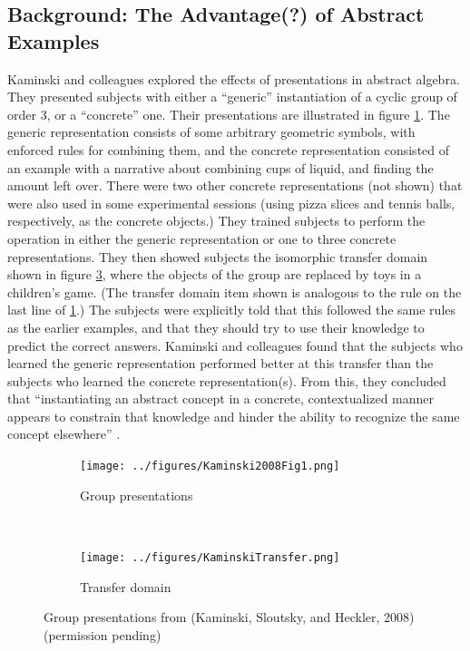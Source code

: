 \documentclass[man,10pt]{apa6}
\begin{document}
\subsection{Background: The Advantage(?) of Abstract Examples}
Kaminski and colleagues \cite{Kaminski2008} explored the effects of presentations in abstract algebra. They presented subjects with either a ``generic'' instantiation of a cyclic group of order 3, or a ``concrete'' one. Their presentations are illustrated in figure \ref{kaminskitraining}. The generic representation consists of some arbitrary geometric symbols, with enforced rules for combining them, and the concrete representation consisted of an example with a narrative about combining cups of liquid, and finding the amount left over. There were two other concrete representations (not shown) that were also used in some experimental sessions (using pizza slices and tennis balls, respectively, as the concrete objects.) They trained subjects to perform the operation in either the generic representation or one to three concrete representations. They then showed subjects the isomorphic transfer domain shown in figure \ref{kaminskitransfer}, where the objects of the group are replaced by toys in a children's game. (The transfer domain item shown is analogous to the rule on the last line of \ref{kaminskitraining}.) The subjects were explicitly told that this followed the same rules as the earlier examples, and that they should try to use their knowledge to predict the correct answers. Kaminski and colleagues found that the subjects who learned the generic representation performed better at this transfer than the subjects who learned the concrete representation(s). From this, they concluded that ``instantiating an abstract concept in a concrete, contextualized manner appears to constrain that knowledge and hinder the ability to recognize the same concept elsewhere'' \cite{Kaminski2008}. \par
\begin{figure} \centering \begin{subfigure}{0.5\textwidth} \caption{Group presentations} \label{kaminskitraining} \texttt{[image: ../figures/Kaminski2008Fig1.png]} \end{subfigure} \\ \begin{subfigure}{0.5\textwidth} \caption{Transfer domain} \label{kaminskitransfer} \texttt{[image: ../figures/KaminskiTransfer.png]} \end{subfigure} \caption{Group presentations from (Kaminski, Sloutsky, and Heckler, 2008) (permission pending)} \end{figure}\noindent
\end{document}

